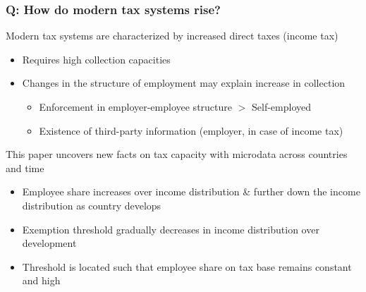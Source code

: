 \documentclass[aspectratio=169]{beamer}
\begin{document}
\begin{frame}
\frametitle{Q: How do modern tax systems rise?}
Modern tax systems are characterized by increased direct taxes (income tax)
\begin{itemize}\setlength\itemsep{3pt}
\item Requires high collection capacities 
\item Changes in the structure of employment may explain increase in collection
\begin{itemize}\setlength\itemsep{3pt}
\item Enforcement in employer-employee structure $>$ Self-employed
\item Existence of third-party information (employer, in case of income tax)
\end{itemize}
\end{itemize}\medskip
This paper uncovers new facts on tax capacity with microdata across countries and time
\begin{itemize}\setlength\itemsep{3pt}
\item Employee share increases over income distribution \& further down the income distribution as country develops 
\item Exemption threshold gradually decreases in income distribution over development
\item Threshold is located such that employee share on tax base remains constant and high
\end{itemize}
\end{frame}
\end{document}
